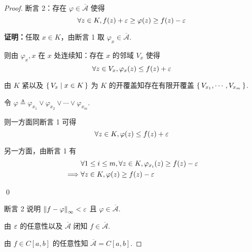 \begin{proof}
    断言 2：存在 $\varphi\in\overline{\mathscr{A}}$ 使得
$$
\forall z\in K,f(z)+\varepsilon\ge\varphi(z)\ge f(z)-\varepsilon
$$

    \textbf{证明：}任取 $x\in K$，由断言 1 取 $\varphi_x\in\overline{\mathscr{A}}$.

    则由 $\varphi_x,x$ 在 $x$ 处连续知：存在 $x$ 的邻域 $V_x$ 使得
$$
\forall z\in V_x,\varphi_x(z)\le f(z)+\varepsilon
$$

    由 $K$ 紧以及 $\set{V_x|x\in K}$ 为 $K$ 的开覆盖知存在有限开覆盖 $\set{V_{x_1},\cdots,V_{x_m}}$.

    令 $\varphi\triangleq\varphi_{x_1}\vee\varphi_{x_2}\vee\cdots\vee\varphi_{x_m}$.

    则一方面同断言 1 可得
$$
\forall z\in K,\varphi(z)\le f(z)+\varepsilon
$$

    另一方面，由断言 1 有
$$
\begin{aligned}
    &\forall 1\le i\le m,\forall z\in K,\varphi_{x_i}(z)\ge f(z)-\varepsilon\\
    \implies&\forall z\in K,\varphi(z)\ge f(z)-\varepsilon
\end{aligned}
$$

    \qed

    断言 2 说明 $\left\lVert{f-\varphi}\right\rVert_\infty<\varepsilon$ 且 $\varphi\in\overline{\mathscr{A}}$.

    由 $\varepsilon$ 的任意性以及 $\overline{\mathscr{A}}$ 闭知 $f\in\overline{\mathscr{A}}$.

    由 $f\in C[a,b]$ 的任意性知 $\overline{\mathscr{A}}=C[a,b]$.
\end{proof}